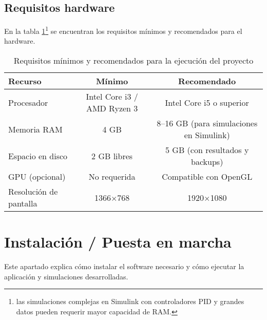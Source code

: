 \subsection{Requisitos hardware}
En la tabla \ref{tab:requisitos}\footnote{las simulaciones complejas en Simulink con controladores PID y grandes datos pueden requerir mayor capacidad de RAM.} se encuentran los requisitos mínimos y recomendados para el hardware.
\begin{table}[H]
\small
\centering
\caption{Requisitos mínimos y recomendados para la ejecución del proyecto}
\label{tab:requisitos}
\begin{tabular}{|l|c|c|}
\hline
\textbf{Recurso}         & \textbf{Mínimo}                      & \textbf{Recomendado}                    \\
\hline
Procesador               & Intel Core i3 / AMD Ryzen 3          & Intel Core i5 o superior                \\
\hline
Memoria RAM              & 4 GB                                 & 8--16 GB (para simulaciones en Simulink) \\
\hline
Espacio en disco         & 2 GB libres                          & 5 GB (con resultados y backups)         \\
\hline
GPU (opcional)           & No requerida                         & Compatible con OpenGL                   \\
\hline
Resolución de pantalla   & 1366$\times$768                      & 1920$\times$1080                        \\
\hline
\end{tabular}
\end{table}


\section{Instalación / Puesta en marcha}
Este apartado explica cómo instalar el software necesario y cómo ejecutar la aplicación y simulaciones desarrolladas.


